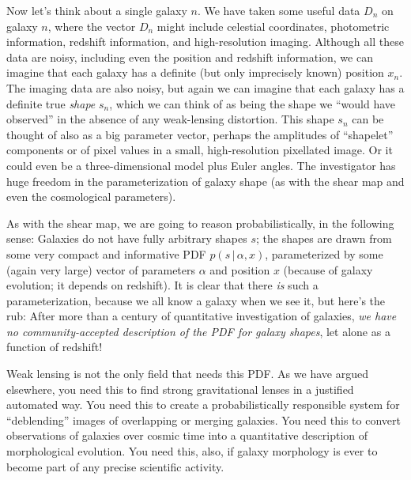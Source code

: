 \documentclass[12pt, pdftex]{article}
\newcommand{\given}{\,|\,}
\newcommand{\position}{x}
\newcommand{\data}{D}
\newcommand{\shape}{s}
\newcommand{\shapepars}{\alpha}
\begin{document}
Now let's think about a single galaxy $n$.  We have taken some useful
data $\data_n$ on galaxy $n$, where the vector $\data_n$ might include
celestial coordinates, photometric information, redshift information,
and high-resolution imaging.  Although all these data are noisy,
including even the position and redshift information, we can imagine
that each galaxy has a definite (but only imprecisely known) position
$\position_n$.  The imaging data are also noisy, but again we can
imagine that each galaxy has a definite true \emph{shape} $\shape_n$,
which we can think of as being the shape we ``would have observed'' in
the absence of any weak-lensing distortion.  This shape $\shape_n$ can
be thought of also as a big parameter vector, perhaps the amplitudes
of ``shapelet'' components or of pixel values in a small,
high-resolution pixellated image.  Or it could even be a
three-dimensional model plus Euler angles.  The investigator has huge
freedom in the parameterization of galaxy shape (as with the shear map
and even the cosmological parameters).

As with the shear map, we are going to reason probabilistically, in
the following sense: Galaxies do not have fully arbitrary shapes
$\shape$; the shapes are drawn from some very compact and informative
PDF $p(\shape\given\shapepars,\position)$, parameterized by some (again
very large) vector of parameters $\shapepars$ and position $\position$
(because of galaxy evolution; it depends on redshift).  It is clear
that there \emph{is} such a parameterization, because we all know a
galaxy when we see it, but here's the rub: After more than a century
of quantitative investigation of galaxies, \emph{we have no
  community-accepted description of the PDF for galaxy shapes}, let
alone as a function of redshift!

Weak lensing is not the only field that needs this PDF.  As we have
argued elsewhere, you need this to find strong gravitational lenses in
a justified automated way.  You need this to create a
probabilistically responsible system for ``deblending'' images of
overlapping or merging galaxies.  You need this to convert
observations of galaxies over cosmic time into a quantitative
description of morphological evolution.  You need this, also, if
galaxy morphology is ever to become part of any precise scientific
activity.
\end{document}
